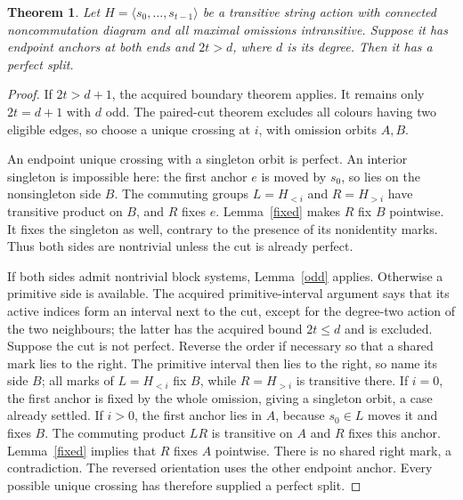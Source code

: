 \documentclass[11pt,a4paper]{article}
\newtheorem{theorem}[lemma]{Theorem}
\newcommand{\gen}[1]{\langle#1\rangle}
\begin{document}
\begin{theorem}\label{anchors}
Let $H=\gen{s_0,\ldots,s_{t-1}}$ be a transitive string action
with connected noncommutation diagram and all maximal omissions
intransitive. Suppose it has endpoint anchors at both ends and
$2t>d$, where $d$ is its degree. Then it has a perfect split.
\end{theorem}
\begin{proof}
If $2t>d+1$, the acquired boundary theorem applies. It remains
only $2t=d+1$ with $d$ odd. The paired-cut theorem excludes
all colours having two eligible edges, so choose a unique crossing
at $i$, with omission orbits $A,B$.

An endpoint unique crossing with a singleton orbit is perfect.
An interior singleton is impossible here: the first anchor $e$
is moved by $s_0$, so lies on the nonsingleton side $B$.
The commuting groups $L=H_{<i}$ and $R=H_{>i}$ have transitive
product on $B$, and $R$ fixes $e$. Lemma~\ref{fixed} makes
$R$ fix $B$ pointwise. It fixes the singleton as well, contrary
to the presence of its nonidentity marks. Thus both sides are
nontrivial unless the cut is already perfect.

If both sides admit nontrivial block systems, Lemma~\ref{odd}
applies. Otherwise a primitive side is available. The acquired
primitive-interval argument says that its active indices form an
interval next to the cut, except for the degree-two action of the
two neighbours; the latter has the acquired bound $2t\le d$ and
is excluded. Suppose the cut is not perfect. Reverse the order
if necessary so that a shared mark lies to the right. The primitive
interval then lies to the right, so name its side $B$; all marks
of $L=H_{<i}$ fix $B$, while $R=H_{>i}$ is transitive there.
If $i=0$, the first anchor is fixed by the whole omission, giving
a singleton orbit, a case already settled. If $i>0$, the first
anchor lies in $A$, because $s_0\in L$ moves it and fixes $B$.
The commuting product $LR$ is transitive on $A$ and $R$ fixes
this anchor. Lemma~\ref{fixed} implies that $R$ fixes $A$
pointwise. There is no shared right mark, a contradiction.
The reversed orientation uses the other endpoint anchor.
Every possible unique crossing has therefore supplied a perfect split.
\end{proof}
\end{document}
